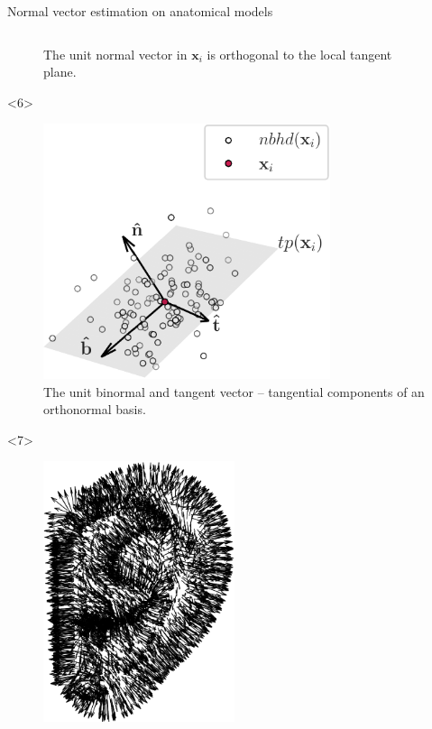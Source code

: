 \documentclass[xcolor=dvipsnames,10pt]{beamer}
\begin{document}
\begin{frame}{Normal vector estimation on anatomical models}
\begin{columns}[c]
\begin{column}{0.5\textwidth}
\begin{onlyenv}
\begin{center}
\begin{figure}
                    \caption{The unit normal vector in $\boldsymbol{x}_i$ is orthogonal to the local tangent plane.}
                \end{figure}
                \end{center}
            \end{onlyenv}
            \begin{onlyenv}<6>
                \begin{center}
                \begin{figure}
                    \includegraphics[width=0.75\textwidth]{figures/orthogonal_set_4.pdf}
                    \caption{The unit binormal and tangent vector -- tangential components of an orthonormal basis.}
                \end{figure}
                \end{center}
            \end{onlyenv}
            \begin{onlyenv}<7>
                \begin{center}
                \begin{figure}
                    \includegraphics[width=0.5\textwidth]{figures/ear_pcd_n.pdf}

\end{figure}
\end{center}
\end{onlyenv}
\end{column}
\end{columns}
\end{frame}
\end{document}
